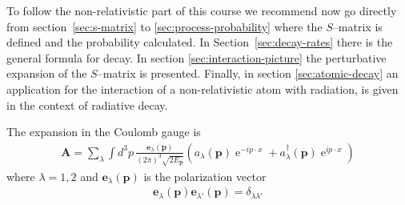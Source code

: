 To follow the non-relativistic part of this course we recommend now go directly from section~\ref{sec:s-matrix} to \ref{sec:process-probability} where the $S$--matrix is defined and the probability calculated. In Section~\ref{sec:decay-rates} there is the general formula for decay. In section \ref{sec:interaction-picture} the perturbative expansion of the $S$--matrix is presented. Finally, in section \ref{sec:atomic-decay} an application for the interaction of a non-relativistic atom with radiation, is given in the context of radiative decay.


The expansion in the Coulomb gauge is %
\begin{align}
  \mathbf{A}=\sum_{\lambda}\int d^3p\,\frac{\mathbf{e}_{\lambda}(\mathbf{p})}{(2\pi)^3\sqrt{2 E_{\mathbf{p}}}}
\left( a_{\lambda}(\mathbf{p})\operatorname{e}^{-ip\cdot x} + a_{\lambda}^{\dagger}(\mathbf{p})\operatorname{e}^{ip\cdot x}\right)
\end{align}
where $\lambda=1,2$ and $\mathbf{e}_{\lambda}(\mathbf{p})$ is the polarization vector
\begin{align}
  \mathbf{e}_{\lambda}(\mathbf{p})  \mathbf{e}_{\lambda'}(\mathbf{p})=\delta_{\lambda\lambda'}
\end{align}



